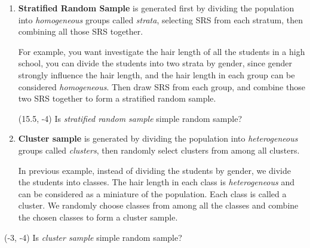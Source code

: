 \documentclass[a4paper, 12pt,twoside]{book}
\begin{document}
\begin{enumerate}
\item \textbf{Stratified Random Sample} is generated first by dividing the population into \textit{homogeneous} groups called \textit{strata}, selecting SRS from each stratum, then combining all those SRS together. 
\vspace{0.3cm}

For example, you want investigate the hair length of all the students in a high school, you can divide the students into two strata by gender, since gender strongly influence the hair length, and the hair length in each group can be considered \textit{homogeneous}. Then draw SRS from each group, and combine those two SRS together to form a stratified random sample.
\vspace{0.3cm}

\begin{textblock}{3}(15.5, -4)
\noindent
Is \textit{stratified random sample} simple random sample?\\
\end{textblock}

\item \textbf{Cluster sample} is generated by dividing the population into \textit{heterogeneous} groups called \textit{clusters}, then randomly select clusters from among all clusters. 
\vspace{0.3cm}

In previous example, instead of dividing the students by gender, we divide the students into classes. The hair length in each class is \textit{heterogeneous} and can be considered as a miniature of the population. Each class is called a cluster. We randomly choose classes from among all the classes and combine the chosen classes to form a cluster sample.
\end{enumerate}
\vspace{0.3cm}

\begin{textblock}{3}(-3, -4)
\noindent
Is \textit{cluster sample} simple random sample?\\
\end{textblock}
\end{document}
